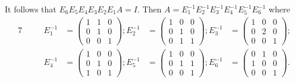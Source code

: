 \begin{Exercise}
\begin{solution}
		It follows that $E_6 E_5 E_4 E_3 E_2 E_1 A = I$. Then $A = E_1^{-1} E_2^{-1} E_3^{-1} E_4^{-1} E_5^{-1} E_6^{-1}$ where \begin{alignat*}{7}
		\quad&& E_1^{-1} &= \begin{pmatrix}
		1 & 1 & 0 \\
		0 & 1 & 0 \\
		0 & 0 & 1
		\end{pmatrix}; E_2^{-1} &= \begin{pmatrix}
		1 & 0 & 0 \\
		0 & 1 & 0 \\
		0 & 1 & 1
		\end{pmatrix}; E_3^{-1} &= \begin{pmatrix}
		1 & 0 & 0 \\
		0 & 2 & 0 \\
		0 & 0 & 1
		\end{pmatrix}; \\
		\quad&& E_4^{-1} &= \begin{pmatrix}
		1 & 0 & 0 \\
		0 & 1 & 0 \\
		1 & 0 & 1
		\end{pmatrix}; E_5^{-1} &= \begin{pmatrix}
		1 & 0 & 0 \\
		0 & 1 & 1 \\
		0 & 0 & 1
		\end{pmatrix}; E_6^{-1} &= \begin{pmatrix}
		0 & 1 & 0 \\
		1 & 0 & 0 \\
		0 & 0 & 1
		\end{pmatrix}.
		\end{alignat*}
	\end{solution}
\end{Exercise}